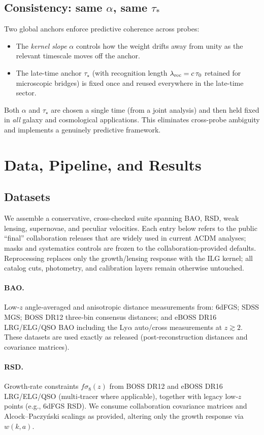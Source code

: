 \documentclass[11pt]{article}
\begin{document}
\subsection{Consistency: same \texorpdfstring{$\alpha$}{alpha}, same \texorpdfstring{$\tau_* $}{tau-star}}
Two global anchors enforce predictive coherence across probes:
\begin{itemize}
  \item The \emph{kernel slope} $\alpha$ controls how the weight drifts away from unity as the relevant timescale moves off the anchor.
  \item The late-time anchor $\tau_\star$ (with recognition length $\lambda_{\rm rec}=c\,\tau_0$ retained for microscopic bridges) is fixed once and reused everywhere in the late-time sector.
\end{itemize}
Both $\alpha$ and $\tau_\star$ are chosen a single time (from a joint analysis) and then held fixed in \emph{all} galaxy and cosmological applications. This eliminates cross-probe ambiguity and implements a genuinely predictive framework.

\section{Data, Pipeline, and Results}
\subsection{Datasets}
We assemble a conservative, cross-checked suite spanning BAO, RSD, weak lensing, supernovae, and peculiar velocities. Each entry below refers to the public ``final'' collaboration releases that are widely used in current ΛCDM analyses; masks and systematics controls are frozen to the collaboration‑provided defaults. Reprocessing replaces only the growth/lensing response with the ILG kernel; all catalog cuts, photometry, and calibration layers remain otherwise untouched.

\paragraph{BAO.} 
Low‑$z$ angle‑averaged and anisotropic distance measurements from: 6dFGS; SDSS MGS; BOSS DR12 three‑bin consensus distances; and eBOSS DR16 LRG/ELG/QSO BAO including the Ly$\alpha$ auto/cross measurements at $z\gtrsim 2$. These datasets are used exactly as released (post‑reconstruction distances and covariance matrices).

\paragraph{RSD.}
Growth‑rate constraints $f\sigma_8(z)$ from BOSS DR12 and eBOSS DR16 LRG/ELG/QSO (multi‑tracer where applicable), together with legacy low‑$z$ points (e.g., 6dFGS RSD). We consume collaboration covariance matrices and Alcock–Paczyński scalings as provided, altering only the growth response via $w(k,a)$.
\end{document}
